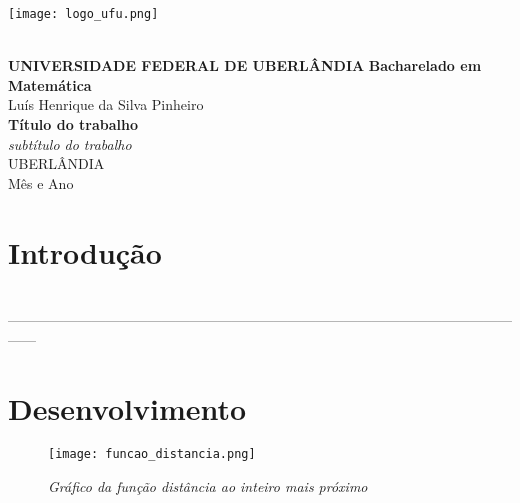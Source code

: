 \documentclass[12pt,twoside]{article}
\begin{document}
    
    \begin{titlepage}
        \begin{center}
            \parbox{3.5cm}{\texttt{[image: logo\_ufu.png]}} \\
            \vspace{1cm}
            {\Large \bf UNIVERSIDADE FEDERAL DE UBERLÂNDIA}
            {\large \bf Bacharelado em Matemática} \\
            \vspace{2cm}
            {\large Luís Henrique da Silva Pinheiro} \\
            \vspace{3cm}
            {\Large \bf Título do trabalho} \\
            {\large \it subtítulo do trabalho} \\
            \vspace{8cm}
            {UBERLÂNDIA \\ Mês e Ano}
        \end{center}
    \end{titlepage}
    
    \tableofcontents
    \thispagestyle{empty}
    \newpage
    
    
    \section{Introdução}
        \cite{carothers} \cite{cariello}
        \lipsum[1] \\
        ------------------------------------------------------------------------------------------------------------------
        
        \newpage
        
    \section{Desenvolvimento}
        \lipsum[1]
        
        \begin{figure}[h!]
            \centering
            \texttt{[image: funcao\_distancia.png]}
            \caption{\it Gráfico da função distância ao inteiro mais próximo}
            \label{fig:my_label}
        \end{figure}
        
\end{document}
